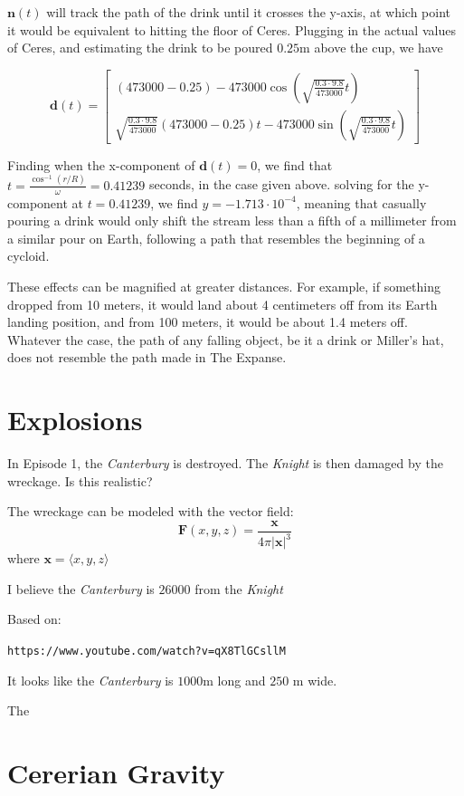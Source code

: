 \documentclass{amsart}
\renewcommand{\vec}{\textbf}
\theoremstyle{definition}
\begin{document}
$\vec{n}(t)$ will track the path of the drink until it crosses the
y-axis, at which point it would be equivalent to hitting the floor of
Ceres. Plugging in the actual values of Ceres, and estimating the
drink to be poured $0.25$m above the cup, we have

\[
\vec{d}(t) = 
\begin{bmatrix}
(473000 - 0.25) - 473000\cos(\sqrt{\frac{0.3\cdot9.8}{473000}}t)\\ \sqrt{\frac{0.3\cdot9.8}{473000}}(473000 - 0.25)t - 473000 \sin(\sqrt{\frac{0.3\cdot9.8}{473000}}t)
\end{bmatrix}
\]

Finding when the x-component of $\vec{d}(t) = 0$, we find that $t =
\frac{\cos^{-1}(r/R)}{\omega} = 0.41239$ seconds, in the case given
above. solving for the y-component at $t=0.41239$, we find $y = -1.713
\cdot 10^{-4}$, meaning that casually pouring a drink would only shift
the stream less than a fifth of a millimeter from a similar pour on
Earth, following a path that resembles the beginning of a cycloid.

These effects can be magnified at greater distances. For example, if
something dropped from 10 meters, it would land about 4 centimeters
off from its Earth landing position, and from 100 meters, it would be
about 1.4 meters off. Whatever the case, the path of any falling
object, be it a drink or Miller's hat, does not resemble the path made
in The Expanse.

\section{Explosions}

In Episode 1, the \textit{Canterbury} is destroyed. 
The \textit{Knight} is then damaged by the wreckage. 
Is this realistic?

The wreckage can be modeled with the vector field:
\[
\vec{F}(x,y,z) = \frac{\vec{x}}{4\pi|\vec{x}|^3}
\]
where $\vec{x} = \langle x,y,z\rangle$

I believe the \textit{Canterbury} is $26000$ from the \textit{Knight}

Based on:

\texttt{https://www.youtube.com/watch?v=qX8TlGCsllM}

It looks like the \textit{Canterbury} is $1000$m long and $250$ m wide. 

The


\section{Cererian Gravity}
\end{document}
